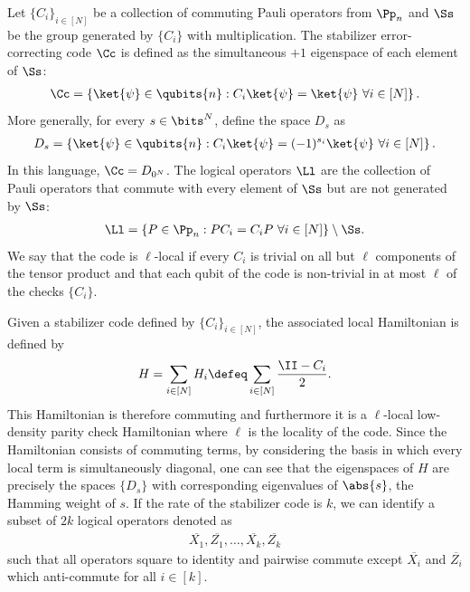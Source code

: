 \documentclass{toc}
\begin{document}
\begin{definition}
Let $\{C_i\}_{i \in [N]}$ be a collection of commuting Pauli operators from $\Pp_n$ and $\Ss$ be the group generated by $\{C_i\}$ with multiplication. The stabilizer error-correcting code $\Cc$ is defined as the simultaneous $+1$ eigenspace of each element of $\Ss$: 
\begin{align}
    \Cc = \left\{ \ket{\psi} \in \qubits{n} : C_i \ket{\psi} = \ket{\psi} \ \forall i \in [N] \right\}.
\end{align}
More generally, for every $s \in \bits^N$, define the space $D_s$ as
\begin{align}
    D_s = \left\{ \ket{\psi} \in \qubits{n} : C_i \ket{\psi} = (-1)^{s_i} \ket{\psi} \ \forall i \in [N] \right\}.
\end{align}
In this language, $\Cc = D_{0^N}$. The logical operators $\Ll$ are the collection of Pauli operators that commute with every element of $\Ss$ but are not generated by $\Ss$:
\begin{align}
    \Ll = \left \{P \in \Pp_n : P C_i = C_i P \ \forall i \in [N] \right \} \setminus \Ss.
\end{align}
We say that the code is $\ell$-local if every $C_i$ is trivial on all but $\ell$ components of the tensor product and that each qubit of the code is non-trivial in at most $\ell$ of the checks $\{C_i\}$.
\end{definition}
Given a stabilizer code defined by $\{C_i\}_{i \in [N]}$, the associated local Hamiltonian is defined by
\begin{align}
    H = \sum_{i \in [N]} H_i \defeq \sum_{i \in [N]} \frac{\II - C_i}{2}.
\end{align}
This Hamiltonian is therefore commuting and furthermore it is a $\ell$-local low-density parity check Hamiltonian where $\ell$ is the locality of the code. Since the Hamiltonian consists of commuting terms, by considering the basis in which every local term is simultaneously diagonal, one can see that the eigenspaces of $H$ are precisely the spaces $\{D_s\}$ with corresponding eigenvalues of $\abs{s}$, the Hamming weight of $s$. 
If the rate of the stabilizer code is $k$, we can identify a subset of $2k$ logical operators denoted as
\begin{align}
    \overline{X_1}, \overline{Z_1}, \ldots, \overline{X_k}, \overline{Z_k}
\end{align}
such that all operators square to identity and pairwise commute except $\overline{X_i}$ and $\overline{Z_i}$ which anti-commute for all $i \in [k]$.
\end{document}

